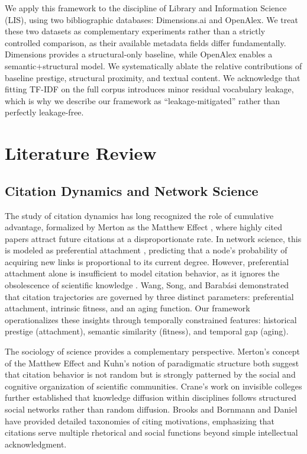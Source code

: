 \documentclass[11pt,a4paper]{article}
\begin{document}
We apply this framework to the discipline of Library and Information Science (LIS), using two bibliographic databases: Dimensions.ai and OpenAlex. We treat these two datasets as complementary experiments rather than a strictly controlled comparison, as their available metadata fields differ fundamentally. Dimensions provides a structural-only baseline, while OpenAlex enables a semantic+structural model. We systematically ablate the relative contributions of baseline prestige, structural proximity, and textual content. We acknowledge that fitting TF-IDF on the full corpus introduces minor residual vocabulary leakage, which is why we describe our framework as ``leakage-mitigated'' rather than perfectly leakage-free.

\section{Literature Review}
\label{sec:lit}

\subsection{Citation Dynamics and Network Science}
The study of citation dynamics has long recognized the role of cumulative advantage, formalized by Merton as the Matthew Effect \citep{merton1968matthew}, where highly cited papers attract future citations at a disproportionate rate. In network science, this is modeled as preferential attachment \citep{barabasi1999emergence}, predicting that a node's probability of acquiring new links is proportional to its current degree. However, preferential attachment alone is insufficient to model citation behavior, as it ignores the obsolescence of scientific knowledge \citep{price1965networks}. Wang, Song, and Barab\'asi \citep{wang2013quantifying} demonstrated that citation trajectories are governed by three distinct parameters: preferential attachment, intrinsic fitness, and an aging function. Our framework operationalizes these insights through temporally constrained features: historical prestige (attachment), semantic similarity (fitness), and temporal gap (aging).

The sociology of science provides a complementary perspective. Merton's concept of the Matthew Effect \citep{merton1968matthew} and Kuhn's notion of paradigmatic structure \citep{kuhn1962structure} both suggest that citation behavior is not random but is strongly patterned by the social and cognitive organization of scientific communities. Crane's work on invisible colleges \citep{crane1972invisible} further established that knowledge diffusion within disciplines follows structured social networks rather than random diffusion. Brooks \citep{brooks1985private} and Bornmann and Daniel \citep{bornmann2008what} have provided detailed taxonomies of citing motivations, emphasizing that citations serve multiple rhetorical and social functions beyond simple intellectual acknowledgment.
\end{document}
